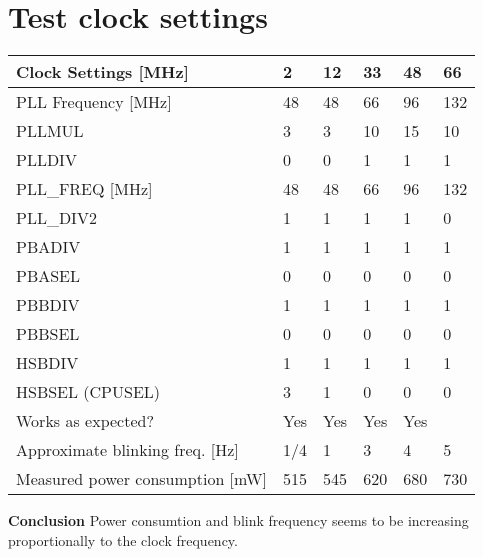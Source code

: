 \documentclass[10pt, a4paper]{article}
\begin{document}
\lstset{language=C,
        breaklines=true
        }
\section{Test clock settings}
\begin{table}[H]
\centering
\begin{tabular}{l l l l l l}
Clock Settings [MHz] & 2 & 12 & 33 & 48 & 66 \\
\hline
PLL Frequency [MHz]  & 48 & 48  & 66 & 96 & 132\\
\hline
PLLMUL & 3 & 3 & 10 & 15 & 10 \\
\hline
PLLDIV& 0 & 0 & 1 & 1 & 1 \\
\hline
PLL\_FREQ [MHz]& 48 & 48 & 66 & 96 & 132 \\
\hline
PLL\_DIV2& 1 & 1 & 1 & 1 & 0 \\
\hline
PBADIV& 1 & 1 & 1& 1 & 1\\
\hline
PBASEL& 0 & 0 & 0 & 0 & 0\\
\hline
PBBDIV& 1 & 1 & 1 & 1 & 1 \\
\hline
PBBSEL& 0 & 0 & 0 & 0 & 0\\
\hline
HSBDIV& 1 & 1 & 1 & 1 & 1\\
\hline
HSBSEL (CPUSEL)& 3 & 1 & 0 & 0 & 0\\
\hline
Works as expected?& Yes & Yes & Yes & Yes & \\
\hline
Approximate blinking freq. [Hz]& 1/4 & 1  & 3 & 4 & 5 \\
\hline
Measured power consumption [mW] & 515 & 545 & 620 & 680 & 730 \\
\hline

\end{tabular}
\end{table}


\textbf{Conclusion}\newline
Power consumtion and blink frequency seems to be increasing proportionally to the clock frequency.
\end{document}
